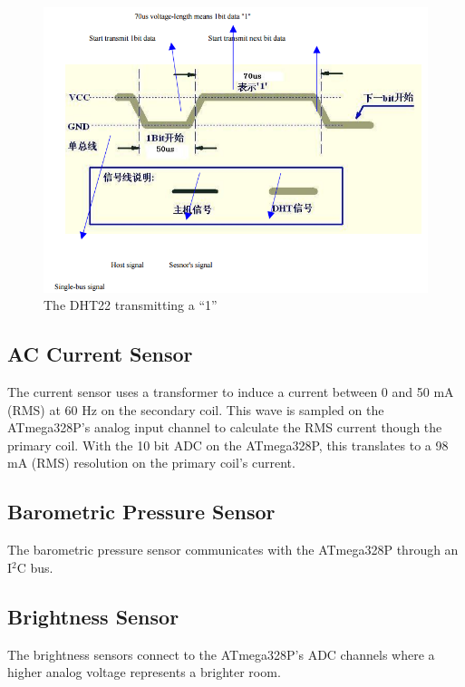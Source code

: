 			\begin{figure}[h!]
				\centering
				\includegraphics[width=\textwidth, angle=0]{DHT22high}
				\caption{The DHT22 transmitting a ``1''}
				\label{fig:DHT22high}
			\end{figure}
			
			\clearpage
			
		\subsection{AC Current Sensor}
			The current sensor uses a transformer to induce a current between 0 and 50 mA (RMS) at 60 Hz on the secondary coil. This wave is sampled on the ATmega328P's analog input channel to calculate the RMS current though the primary coil. With the 10 bit ADC on the ATmega328P, this translates to a 98 mA (RMS) resolution on the primary coil's current. %
		
		\subsection{Barometric Pressure Sensor}
			The barometric pressure sensor communicates with the ATmega328P through an I$^2$C bus. %
			
		\subsection{Brightness Sensor}
			The brightness sensors connect to the ATmega328P's ADC channels where a higher analog voltage represents a brighter room. %
		
